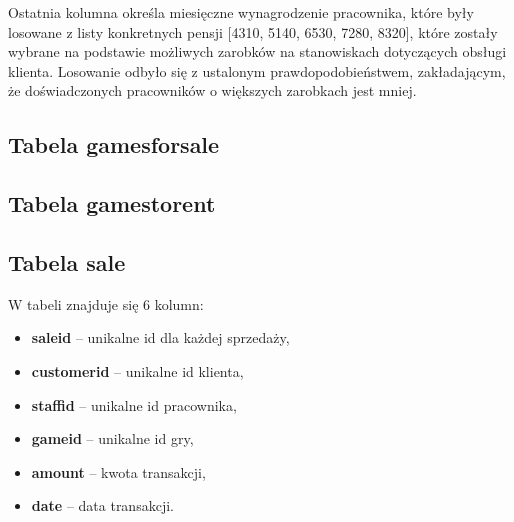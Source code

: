 \documentclass{article}
\begin{document}
		Ostatnia kolumna określa miesięczne wynagrodzenie pracownika, które były losowane z listy konkretnych pensji [4310, 5140, 6530, 7280, 8320], które zostały wybrane na podstawie możliwych zarobków na stanowiskach dotyczących obsługi klienta. Losowanie odbyło się z ustalonym prawdopodobieństwem, zakładającym, że doświadczonych pracowników o większych zarobkach jest mniej.
		
	\subsection{Tabela games\textunderscore for\textunderscore sale}
	
	\subsection{Tabela games\textunderscore to\textunderscore rent}
	
	\subsection{Tabela sale}
		W tabeli znajduje się 6 kolumn:
		\begin{itemize}
			\setlength{\itemsep}{-2pt}
			\item \textbf{sale\textunderscore id} – unikalne id dla każdej sprzedaży,
			\item \textbf{customer\textunderscore id} – unikalne id klienta,
			\item \textbf{staff\textunderscore id} – unikalne id pracownika,
			\item \textbf{game\textunderscore id} – unikalne id gry,
			\item \textbf{amount} – kwota transakcji,
			\item \textbf{date} – data transakcji.
		\end{itemize}
\end{document}
